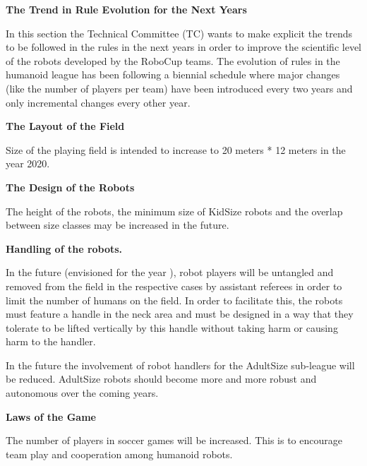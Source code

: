 \clearpage
\sffamily
{\bfseries\color[rgb]{0.4,0.4,0.4}
The Trend in Rule Evolution for the Next Years }

\bigskip

In this section the Technical Committee (TC) wants to make explicit the trends to be followed in the rules in the next years in order to improve the scientific level of the robots developed by the RoboCup teams. The evolution of rules in the humanoid league has been following
a biennial schedule where major changes (like the number of players per team) have been introduced every two years and only incremental changes every other year.

\bigskip

{\bfseries The Layout of the Field}

\headlinebox

Size of the playing field is intended to increase to 20 meters * 12 meters in the year 2020.

\bigskip

{\bfseries The Design of the Robots}

\headlinebox

The height of the robots, the minimum size of KidSize robots and the overlap between size classes may be increased in the future.

\bigskip

{\bfseries Handling of the robots.}

\headlinebox

In the future (envisioned for the year ), robot players will be untangled and removed from the field in the respective cases by assistant referees in order to limit the number of humans on the field. In order to facilitate this, the robots must feature a handle in the neck area and must be designed in a way that they tolerate to be lifted vertically by this handle without taking harm or causing harm to the handler.

\bigskip

In the future the involvement of robot handlers for the AdultSize sub-league will be reduced. AdultSize robots should become more and more robust and autonomous over the coming years.

\bigskip

{\bfseries Laws of the Game}

\headlinebox

The number of players in soccer games will be increased. This is to encourage team play and cooperation among humanoid robots.

